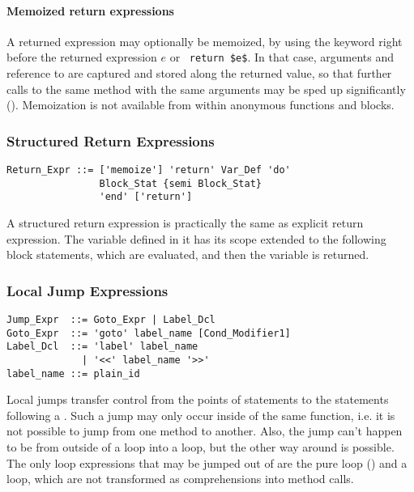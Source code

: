 \paragraph{Memoized return expressions}
A returned expression may optionally be memoized, by using the keyword  right before the returned expression $e$ or ~\lstinline!return $e$!. In that case, arguments and reference to  are captured and stored along the returned value, so that further calls to the same method with the same arguments may be sped up significantly (). Memoization is not available from within anonymous functions and blocks. 






\subsubsection{Structured Return Expressions}

\syntax\begin{lstlisting}
Return_Expr ::= ['memoize'] 'return' Var_Def 'do' 
                Block_Stat {semi Block_Stat} 
                'end' ['return']
\end{lstlisting}

A structured return expression is practically the same as explicit return expression. The variable defined in it has its scope extended to the following block statements, which are evaluated, and then the variable is returned. 






\subsubsection{Local Jump Expressions}
\label{sec:local-jump-expressions}

\syntax\begin{lstlisting}
Jump_Expr  ::= Goto_Expr | Label_Dcl
Goto_Expr  ::= 'goto' label_name [Cond_Modifier1]
Label_Dcl  ::= 'label' label_name 
             | '<<' label_name '>>'
label_name ::= plain_id
\end{lstlisting}

Local jumps transfer control from the points of  statements to the statements following a . Such a jump may only occur inside of the same function, i.e. it is not possible to jump from one method to another. Also, the jump can't happen to be from outside of a loop into a loop, but the other way around is possible. The only loop expressions that may be jumped out of are the pure loop () and a  loop, which are not transformed as comprehensions into method calls. 






